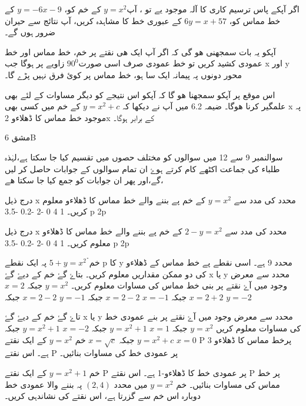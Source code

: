 اگر آپکے پاس ترسیم کاری کا آلہ موجود یے تو ، آپ\( y=x^{2}  \) کے خم کو، \( y=-6x-9  \) کے خط مماس کو، \( 6y=x+57  \) کے عبوری خط کا مشاہدہ کریں، آپ نتائج سے حیران ضرور ہوں گے۔

آپکو یہ بات سمجھنی ھو گی کہ اگر آپ ایک ھی نقتے پر خم، خط مماس اور خط عمودی کشید کریں تو خط عمودی صرف اسی صورت\(90^0\) زاویے پر ہوگا جب x   اور  y محور دونوں پہ پیمانہ ایک سا ہو، خط مماس پر کوئ فرق نہیں پڑے گا۔  

اس موقع پر آپکو سمجھنا ھو گا کہ آپکو اس نتیجے کو دیگر مساوات کے لئے بھی علمگیر کرنا ھوگا۔ ضیمہ 6.2 میں آپ نے دیکھا کہ \( y=x^{2} +c \) کے خم میں کسی بھی x پہ موجود خط مماس کا ڈھلاءو 2x کے برابر ہوگا۔

مشق 6B


سوالنمبر 9  سے 12 میں سوالوں کو مختلف حصوں میں تقسیم کیا جا سکتا ہے،لہٰذہ طلباء کی جماعت اکٹھے کام کرتے ہوۓ ان تمام سوالوں کے جوابات حاصل کر لیں گے،اور پھر ان جوابات کو جمع کیا جا سکتا ھے،

درج ذیل x  محدد کی مدد سے \( y=x^{2}\)  کے خم پے    بننے والے خط مماس کا ڈھلاءو معلوم کریں۔ 
 1
4
0
-2
-0.2
-3.5
p
2p



درج ذیل x  محدد کی مدد سے \(2- y=x^{2}\)  کے خم پے    بننے والے خط مماس کا ڈھلاءو معلوم کریں۔ 
1
4
0
-2
-0.2
-3.5
p
2p



خم  \(5+ y=x^{2} ۤۤ\) پہ ایک نقطے  p کا    y محدد  9 ہے۔ اسی نقطے پے خط مماس کے ڈھلاءو کی دو ممکن مقداریں معلوم کریں۔
 بتاۓ گۓ خم کے دیۓ گۓ x  یا   y محدد سے معرض وجود میں آۓ نقتے پر بنی خط مماس کی مساوات معلوم کریں۔
\( y=x^{2}\) جبکہ \( x=2\)
\( x=2 +2 \)  جبکہ \( x=-1\)
\( x=2 -2 \)   جبکہ    \( y=-1\)
 \( x=2 -2 \)  جبکہ    \( y=-2\)



تاۓ گۓ خم کے دیۓ گۓ x  یا   y محدد سے معرض وجود میں آۓ نقتے پر بنے عمودی خط  کی مساوات معلوم کریں  
\( y=x^{2}\)        جبکہ      \(x=1\)
\( y=x^{2}+1\)   جبکہ       \(x=-2\)        
\( y=x^{2}+1\)     جبکہ      \(x=0\)
\( y=x^{2}+c\)     جبکہ       \(x=\sqrt{c}\)
خم \( y=x^{2}\) کے ایک نقتے P پرخط مماس کا ڈھلاءو 3 ہے۔ اس نقتے P پر عمودی خط کی مساوات بنائیں۔


خم  \( y=x^{2}+1\) کے ایک نقتے P پر عمودی خط  کا ڈھلاءو-1 ہے۔ اس نقتے P پر  خط مماس  کی مساوات بنائیں۔
خم \( y=x^{2}\) میں محدد \( (2,4) \) پہ بننے والا عمودی خط دوبارہ اس خم سے گزرتا ہے، اس نقتے کی نشاندہی کریں۔


